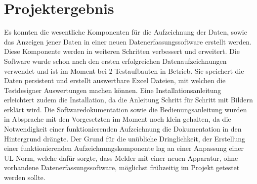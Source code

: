 \documentclass[10pt]{scrartcl}
\begin{document}
\section{Projektergebnis}
Es konnten die wesentliche Komponenten für die Aufzeichnung der Daten, sowie das Anzeigen jener Daten in einer neuen Datenerfassungssoftware erstellt werden. Diese Komponente werden in weiteren Schritten verbessert und erweitert. Die Software wurde schon nach den ersten erfolgreichen Datenaufzeichnungen verwendet und ist im Moment bei 2 Testaufbauten in Betrieb. Sie speichert die Daten persistent und erstellt auswertbare Excel Dateien, mit welchen die Testdesigner Auswertungen machen können.
Eine Installationsanleitung erleichtert zudem die Installation, da die Anleitung Schritt für Schritt mit Bildern erklärt wird. Die Softwaredokumentation sowie die Bedienungsanleitung wurden in Absprache mit den Vorgesetzten im Moment noch klein gehalten, da die Notwendigkeit einer funktionierenden Aufzeichnung die Dokumentation in den Hintergrund drängte. Der Grund für die unübliche Dringlichkeit, der Erstellung einer funktionierenden Aufzeichnungskomponente lag an einer Anpassung einer UL Norm, welche dafür sorgte, dass Melder mit einer neuen Apparatur, ohne vorhandene Datenerfassungssoftware, möglichst frühzeitig im Projekt getestet werden sollte.
\end{document}
